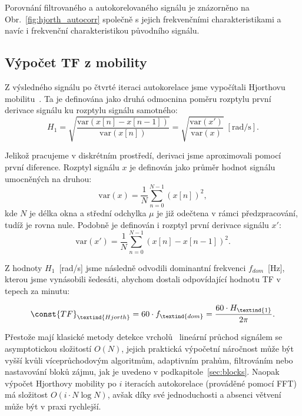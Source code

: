Porovnání filtrovaného a autokorelovaného signálu je znázorněno na Obr.~\ref{fig:hjorth_autocorr} společně s jejich frekvenčními charakteristikami a navíc i frekvenční charakteristikou původního signálu.

\subsection*{Výpočet TF z mobility}
\label{sec:TF_mobilita}
Z výsledného signálu po čtvrté iteraci autokorelace jsme vypočítali Hjorthovu mobilitu~\cite{Hjorth1973,Geetika2022}.
Ta je definována jako druhá odmocnina poměru rozptylu první derivace signálu ku rozptylu signálu samotného:
\begin{equation}
	\label{eq:hjorth_mobility}
	H_1 = \sqrt{ \frac{ \mathrm{var}(x[n] - x[n-1]) }{ \mathrm{var}(x[n]) } } = \sqrt{ \frac{ \mathrm{var}(x') }{ \mathrm{var}(x) } } \; [\mathrm{rad/s}].
\end{equation}

Jelikož pracujeme v diskrétním prostředí, derivaci jsme aproximovali pomocí první diference.
Rozptyl signálu \( x \) je definován jako průměr hodnot signálu umocněných na druhou:
\begin{equation}
	\label{eq:hjorth_var_signal}
	\mathrm{var}(x) = \frac{1}{N} \sum_{n=0}^{N-1} (x[n])^2,
\end{equation}
kde \( N \) je délka okna a střední odchylka \( \mu \) je již odečtena v rámci předzpracování, tudíž je rovna nule.
Podobně je definován i rozptyl první derivace signálu \( x' \):
\begin{equation}
	\label{eq:hjorth_var_signal_diff}
	\mathrm{var}(x') = \frac{1}{N} \sum_{n=0}^{N-1} (x[n] - x[n-1])^2.
\end{equation}

Z hodnoty \( H_1 \)~[rad/s] jsme následně odvodili dominantní frekvenci \( f_{dom} \)~[Hz], kterou jsme vynásobili šedesáti, abychom dostali odpovídající hodnotu \acs{TF} v tepech za minutu:

\begin{equation}
	\const{TF}_{\textind{Hjorth}} = 60 \cdot f_{\textind{dom}} = \frac{60 \cdot H_{\textind{1}}}{2\pi}.
\end{equation}

Přestože mají klasické metody detekce vrcholů~\cite{Elgendi2013} lineární průchod signálem se asymptotickou složitostí \( O(N) \), jejich praktická výpočetní náročnost může být vyšší kvůli víceprůchodovým algoritmům, adaptivním prahům, filtrováním nebo nastavování bloků zájmu, jak je uvedeno v podkapitole~\ref{sec:blocks}.
Naopak výpočet Hjorthovy mobility po \( i \) iteracích autokorelace (prováděné pomocí \acs{FFT}) má složitost \( O(i \cdot N \log N) \), avšak díky své jednoduchosti a absenci větvení může být v praxi rychlejší.


